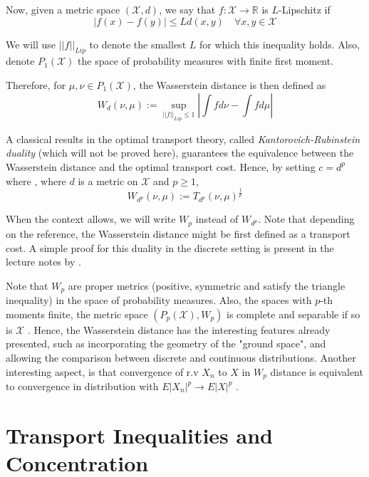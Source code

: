 \documentclass[10pt]{article}
\theoremstyle{definition}
\begin{document}
Now, given a metric space $(\mathcal X, d)$, we say that $f: \mathcal X \rightarrow \mathbb R$
is $L$-Lipschitz if
\begin{equation}
	\mid f(x) - f(y) \mid \leq L d(x,y) \quad \forall x,y \in \mathcal X
\end{equation}

We will use $||f||_{Lip}$ to denote the smallest $L$ for which this inequality holds.
Also, denote $P_1(\mathcal X)$ the space of probability measures with finite first moment.

Therefore, for $\mu,\nu \in P_1(\mathcal X)$, the Wasserstein distance is then defined as 
$$
W_d(\nu, \mu) := \sup_{||f||_{Lip}\leq 1} \left |
\int f d\nu - \int f d\mu	
\right |
$$

A classical results in the optimal transport theory, called
\textit{Kantorovich-Rubinstein duality} (which will not be proved here),
guarantees the equivalence between the Wasserstein distance and the optimal transport cost.
Hence, by setting $c = d^p$ where , where $d$ is a metric
on $\mathcal X$ and $p \geq 1$,
\begin{equation}
W_{d^p}(\nu,\mu):= T_{d^p}(\nu,\mu)^{\frac{1}{p}}
\end{equation}

When the context allows, we will write $W_p$ instead of $W_{d^p}$. Note that depending on
the reference, the Wasserstein distance might be first defined as a transport cost. A
simple proof for this duality in the discrete setting 
is present in the lecture notes by \citet{van2014probability}.

Note that $W_p$ are proper metrics (positive, symmetric and satisfy the triangle inequality)
in the space of probability measures. Also, the spaces with $p$-th moments finite, the
metric space $(P_p(\mathcal X), W_p)$ is complete and separable if so is $\mathcal X$ \citep{panaretos2019statistical}. Hence, the Wasserstein distance has the interesting features
already presented, such as incorporating the geometry of the "ground space", and allowing
the comparison between discrete and continuous distributions. Another interesting aspect,
is that convergence of r.v $X_n$ to $X$ in $W_p$ distance is equivalent to convergence in
distribution with $E|X_n|^p \rightarrow E |X|^p$ \citep{panaretos2019statistical}.

\section{Transport Inequalities and Concentration}
\end{document}
